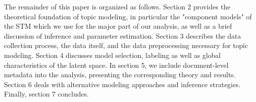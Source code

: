 The remainder of this paper is organized as follows. Section 2 provides the theoretical foundation of topic modeling, in particular the "component models" of the STM which we use for the major part of our analysis, as well as a brief discussion of inference and parameter estimation. Section 3 describes the data collection process, the data itself, and the data preprocessing necessary for topic modeling. Section 4 discusses model selection, labeling as well as global characteristics of the latent space. In section 5, we include document-level metadata into the analysis, presenting the corresponding theory and results. Section 6 deals with alternative modeling approaches and inference strategies. Finally, section 7 concludes.